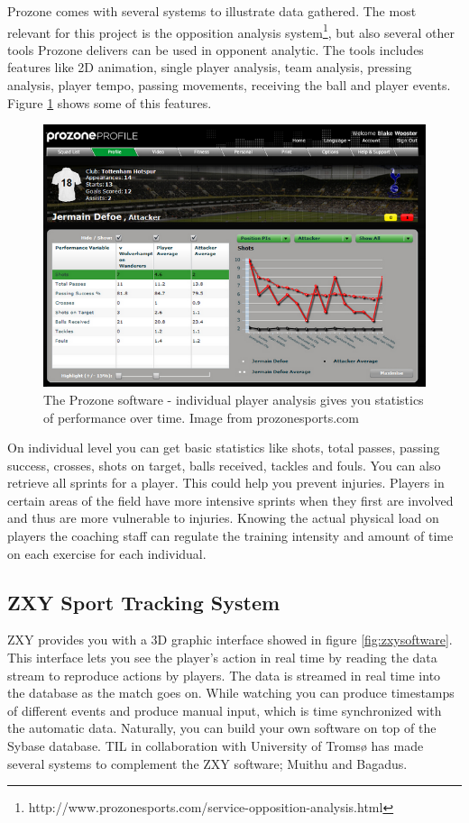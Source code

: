 Prozone comes with several systems to illustrate data gathered. The most relevant for this project is the opposition analysis system\footnote{http://www.prozonesports.com/service-opposition-analysis.html}, but also several other tools Prozone delivers can be used in opponent analytic. The tools includes features like 2D animation, single player analysis, team analysis, pressing analysis, player tempo, passing movements, receiving the ball and player events. Figure \ref{fig:prozone} shows some of this features.

\begin{figure}[ht!]
\centering
\includegraphics[width=1\textwidth]{images/general/prozonestats.png}
\caption{The Prozone software - individual player analysis gives you statistics of performance over time. Image from prozonesports.com}
\label{fig:prozone}
\end{figure}

On individual level you can get basic statistics like shots, total passes, passing success, crosses, shots on target, balls received, tackles and fouls. 
You can also retrieve all sprints for a player. This could help you prevent injuries. Players in certain areas of the field have more intensive sprints when they first are involved and thus are more vulnerable to injuries. Knowing the actual physical load on players the coaching staff can regulate the training intensity and amount of time on each exercise for each individual.

\subsection{ZXY Sport Tracking System}
ZXY provides you with a 3D graphic interface showed in figure \ref{fig:zxysoftware}. This interface lets you see the player’s action in real time by reading the data stream to reproduce actions by players. The data is streamed in real time into the database as the match goes on. While watching you can produce timestamps of different events and produce manual input, which is time synchronized with the automatic data. Naturally, you can build your own software on top of the Sybase database. \ac{TIL} in collaboration with University of Troms{\o} has made several systems to complement the ZXY software; Muithu\cite{muithu} and Bagadus\cite{Saegrov2012}.


